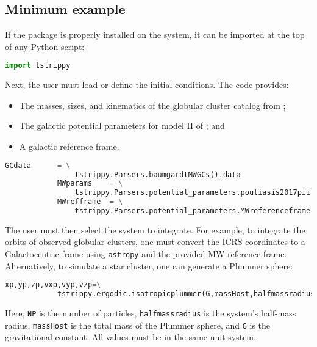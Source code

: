 \documentclass{article}
\begin{document}
    \subsection{Minimum example}
        If the package is properly installed on the system, it can be imported at the top of any Python script:
        \small
        \begin{lstlisting}[language=python]
            import tstrippy    
        \end{lstlisting}
        \normalsize
        Next, the user must load or define the initial conditions. The code provides:
        \begin{itemize}
            \item The masses, sizes, and kinematics of the globular cluster catalog from \citet{2018MNRAS.478.1520B};
            \item The galactic potential parameters for model II of \citet{2017A&A...598A..66P}; and
            \item A galactic reference frame.
        \end{itemize}

        \small
        \begin{lstlisting}[language=python]
            GCdata      = \
                tstrippy.Parsers.baumgardtMWGCs().data
            MWparams    = \
                tstrippy.Parsers.potential_parameters.pouliasis2017pii()
            MWrefframe  = \
                tstrippy.Parsers.potential_parameters.MWreferenceframe()
        \end{lstlisting}
        \normalsize
        The user must then select the system to integrate. For example, to integrate the orbits of observed globular clusters, one must convert the ICRS coordinates to a Galactocentric frame using \texttt{astropy} and the provided MW reference frame. Alternatively, to simulate a star cluster, one can generate a Plummer sphere:
        \small
        \begin{lstlisting}[language=python]
            xp,yp,zp,vxp,vyp,vzp=\
            tstrippy.ergodic.isotropicplummer(G,massHost,halfmassradius,NP)
        \end{lstlisting}
        Here, \texttt{NP} is the number of particles, \texttt{halfmassradius} is the system's half-mass radius, \texttt{massHost} is the total mass of the Plummer sphere, and \texttt{G} is the gravitational constant. All values must be in the same unit system.
\end{document}
